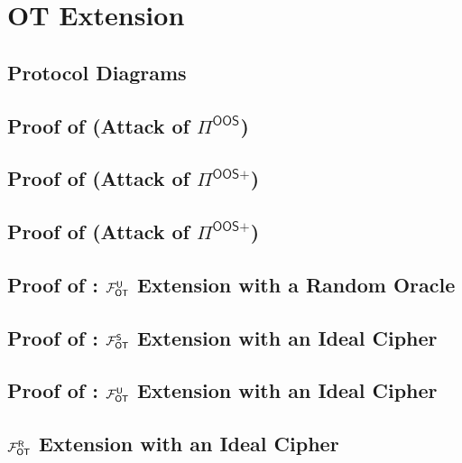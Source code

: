 
\section{OT Extension }\label{sec:extApp}


\iffullversion
\else

\subsection{Protocol Diagrams}




\subsection{Proof of  (Attack of $\Pi^\textsf{OOS}$)}



\subsection{Proof of  (Attack of $\Pi^\textsf{OOS+}$)}



\subsection{Proof of  (Attack of $\Pi^\textsf{OOS+}$)}


\subsection{Proof of : $\mathcal{F}_{\mathsf{OT}}^\mathsf{U}$ Extension with a Random Oracle}



\subsection{Proof of : $\mathcal{F}_{\mathsf{OT}}^\mathsf{S}$ Extension with an Ideal Cipher}



\subsection{Proof of :  $\mathcal{F}_{\mathsf{OT}}^\mathsf{U}$ Extension with an Ideal Cipher}




\subsection{ $\mathcal{F}_{\mathsf{OT}}^\mathsf{R}$ Extension with an Ideal Cipher}

